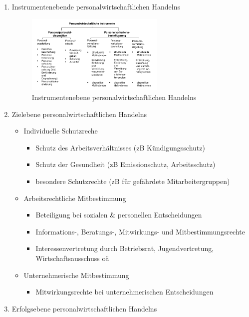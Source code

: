 \documentclass[11pt]{article}
\begin{document}
\begin{enumerate}
\item Instrumentenebende personalwirtschaftlichen Handelns
\label{sec:org945b2e8}
\begin{figure}[htbp]
\centering
\includegraphics[width=250px]{./pictures/persinstr.png}
\caption{Instrumentenebene personalwirtschaftlichen Handelns}
\end{figure} 

\item Zielebene personalwirtschaftlichen Handelns
\label{sec:org7d28a0b}
\begin{itemize}
\item Individuelle Schutzreche
\begin{itemize}
\item Schutz des Arbeitsverhältnisses (zB Kündigungsschutz)
\item Schutz der Gesundheit (zB Emissionschutz, Arbeitsschutz)
\item besondere Schutzrechte (zB für gefährdete Mitarbeitergruppen)
\end{itemize}
\item Arbeitsrechtliche Mitbestimmung
\begin{itemize}
\item Beteiligung bei sozialen \& personellen Entscheidungen
\item Informations-, Beratungs-, Mitwirkungs- und Mitbestimmungsrechte
\item Interessenvertretung durch Betriebsrat, Jugendvertretung, Wirtschaftsausschuss oä
\end{itemize}
\item Unternehmerische Mitbestimmung
\begin{itemize}
\item Mitwirkungsrechte bei unternehmerischen Entscheidungen
\end{itemize}
\end{itemize}

\item Erfolgsebene personalwirtschaftlichen Handelns
\label{sec:orgd825129}


\end{enumerate}
\end{document}
